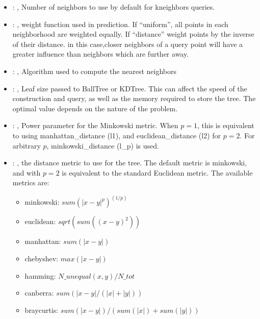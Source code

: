 \begin{itemize}
    \item {}: , 
      Number of neighbors to use by default for kneighbors queries.

    \item {}: , 
      weight function used in prediction. If ``uniform'', all points in each neighborhood
      are weighted equally. If ``distance'' weight points by the inverse of their distance. in this
      case,closer neighbors of a query point will have a greater influence than neighbors which are
      further away.

    \item {}: , 
      Algorithm used to compute the nearest neighbors

    \item {}: , 
      Leaf size passed to BallTree or KDTree. This can affect the speed of the construction
      and query, as well as the memory required to store the tree. The optimal value depends on the
      nature of the problem.

    \item {}: , 
      Power parameter for the Minkowski metric. When $p = 1$, this is equivalent to using
      manhattan\_distance (l1), and euclidean\_distance (l2) for $p = 2$. For arbitrary $p$,
      minkowski\_distance                                                  (l\_p) is used.

    \item {}: , 
      the distance metric to use for the tree. The default metric is minkowski, and with
      $p=2$ is equivalent to the standard Euclidean metric.
      The available metrics are:                                                  \begin{itemize}
      \item minkowski: $sum(|x - y|^p)^(1/p)$
      \item euclidean: $sqrt(sum((x - y)^2))$
      \item manhattan: $sum(|x - y|)$                                                    \item
      chebyshev: $max(|x - y|)$                                                    \item hamming:
      $N\_unequal(x, y) / N\_tot$                                                    \item canberra:
      $sum(|x - y| / (|x| + |y|))$                                                    \item
      braycurtis: $sum(|x - y|) / (sum(|x|) + sum(|y|))$
      \end{itemize}
  \end{itemize}
